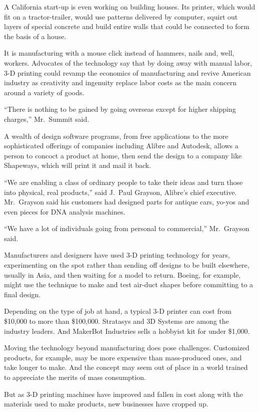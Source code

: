 ﻿\documentclass[12pt]{article}
\begin{document}
A California start-up is even working on building houses. Its printer, which would fit on a
tractor-trailer, would use patterns delivered by computer, squirt out layers of special concrete and
build entire walls that could be connected to form the basis of a house.

It is manufacturing with a mouse click instead of hammers, nails and, well, workers. Advocates of
the technology say that by doing away with manual labor, 3-D printing could revamp the economics of
manufacturing and revive American industry as creativity and ingenuity replace labor costs as the
main concern around a variety of goods.

``There is nothing to be gained by going overseas except for higher shipping charges,'' Mr.~Summit
said.

A wealth of design software programs, from free applications to the more sophisticated offerings of
companies including Alibre and Autodesk, allows a person to concoct a product at home, then send the
design to a company like Shapeways, which will print it and mail it back.

``We are enabling a class of ordinary people to take their ideas and turn those into physical, real
products,'' said J.~Paul Grayson, Alibre's chief executive. Mr.~Grayson said his customers had
designed parts for antique cars, yo-yos and even pieces for DNA analysis machines.

``We have a lot of individuals going from personal to commercial,'' Mr.~Grayson said.

Manufacturers and designers have used 3-D printing technology for years, experimenting on the spot
rather than sending off designs to be built elsewhere, usually in Asia, and then waiting for a model
to return. Boeing, for example, might use the technique to make and test air-duct shapes before
committing to a final design.

Depending on the type of job at hand, a typical 3-D printer can cost from \$10,000 to more than
\$100,000. Stratasys and 3D Systems are among the industry leaders. And MakerBot Industries sells a
hobbyist kit for under \$1,000.

Moving the technology beyond manufacturing does pose challenges. Customized products, for example,
may be more expensive than mass-produced ones, and take longer to make. And the concept may seem out
of place in a world trained to appreciate the merits of mass consumption.

But as 3-D printing machines have improved and fallen in cost along with the materials used to make
products, new businesses have cropped up.
\end{document}
